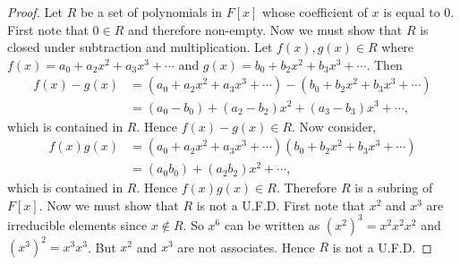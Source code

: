\documentclass[10pt]{article}
\begin{document}
\begin{itemize}
\begin{proof}
Let $R$ be a set of polynomials in $F[x]$ whose coefficient of $x$
is equal to 0.  First note that $0\in R$ and therefore non-empty.
Now we must show that $R$ is closed under subtraction and
multiplication.  Let $f(x),g(x)\in R$ where
$f(x)=a_0+a_2x^2+a_3x^3+\cdots$ and $g(x)=b_0+b_2x^2+b_3x^3+\cdots$.
Then
\begin{align*}
f(x)-g(x)&=(a_0+a_2x^2+a_3x^3+\cdots)-(b_0+b_2x^2+b_3x^3+\cdots)\\
&=(a_0-b_0)+(a_2-b_2)x^2+(a_3-b_3)x^3+\cdots,
\end{align*}
which is contained in $R$.  Hence $f(x)-g(x)\in R$.  Now consider,
\begin{align*}
f(x)g(x)&=(a_0+a_2x^2+a_3x^3+\cdots)(b_0+b_2x^2+b_3x^3+\cdots)\\
&=(a_0b_0)+(a_2b_2)x^2+\cdots,
\end{align*}
which is contained in $R$.  Hence $f(x)g(x)\in R$.  Therefore $R$ is
a subring of $F[x]$. Now we must show that $R$ is not a U.F.D.
First note that $x^2$ and $x^3$ are irreducible elements since
$x\notin R$.  So $x^6$ can be written as $(x^2)^3=x^2x^2x^2$ and
$(x^3)^2=x^3x^3$.  But $x^2$ and $x^3$ are not associates.  Hence
$R$ is not a U.F.D.
\end{proof}

\end{itemize}
\end{document}
